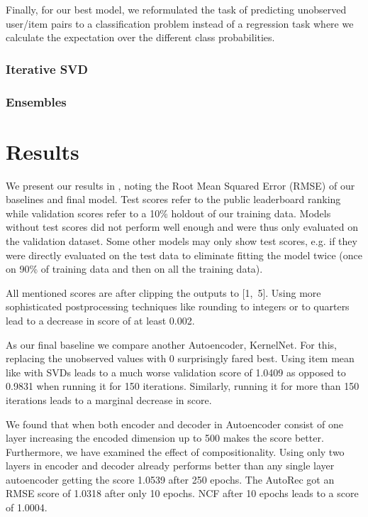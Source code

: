 \documentclass[10pt,conference,compsocconf]{IEEEtran}
\begin{document}
    Finally, for our best model, we reformulated the task of predicting unobserved user/item pairs to a classification problem instead of a regression task where we calculate the expectation over the different class probabilities.

    \subsubsection{Iterative SVD}

    \subsubsection{Ensembles}


    \section{Results}
    We present our results in , noting the Root Mean Squared Error (RMSE) of our baselines and final model.
    Test scores refer to the public leaderboard ranking while validation scores refer to a 10\% holdout of our training data.
    Models without test scores did not perform well enough and were thus only evaluated on the validation dataset.
    Some other models may only show test scores, e.g. if they were directly evaluated on the test data to eliminate
    fitting the model twice (once on 90\% of training data and then on all the training data).

    All mentioned scores are after clipping the outputs to [1,~5].
    Using more sophisticated postprocessing techniques like rounding to integers or to quarters lead to a decrease in score of at least 0.002.



    As our final baseline we compare another Autoencoder, KernelNet.
    For this, replacing the unobserved values with 0 surprisingly fared best.
    Using item mean like with SVDs leads to a much worse validation score of 1.0409 as opposed to 0.9831 when running it for 150 iterations.
    Similarly, running it for more than 150 iterations leads to a marginal decrease in score.
    
    We found that when both encoder and decoder in Autoencoder consist of one layer increasing the encoded dimension up to 500 makes
    the score better. Furthermore, we have examined the effect of compositionality. Using only two layers in encoder
    and decoder already performs better than any single layer autoencoder getting the score 1.0539 after 250 epochs. The AutoRec got an RMSE score of 1.0318 after only 10 epochs. NCF after 10 epochs leads to a score of 1.0004.
\end{document}
